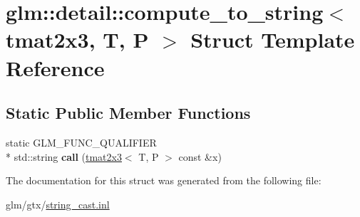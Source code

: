 \hypertarget{structglm_1_1detail_1_1compute__to__string_3_01tmat2x3_00_01T_00_01P_01_4}{\section{glm\-:\-:detail\-:\-:compute\-\_\-to\-\_\-string$<$ tmat2x3, T, P $>$ Struct Template Reference}
\label{structglm_1_1detail_1_1compute__to__string_3_01tmat2x3_00_01T_00_01P_01_4}
}
\subsection*{Static Public Member Functions}
\begin{DoxyCompactItemize}
\item 
\hypertarget{structglm_1_1detail_1_1compute__to__string_3_01tmat2x3_00_01T_00_01P_01_4_a69b0cc0650365f45aaf4c5aba6819abc}{static G\-L\-M\-\_\-\-F\-U\-N\-C\-\_\-\-Q\-U\-A\-L\-I\-F\-I\-E\-R \\*
std\-::string {\bfseries call} (\hyperlink{structglm_1_1tmat2x3}{tmat2x3}$<$ T, P $>$ const \&x)}\label{structglm_1_1detail_1_1compute__to__string_3_01tmat2x3_00_01T_00_01P_01_4_a69b0cc0650365f45aaf4c5aba6819abc}

\end{DoxyCompactItemize}


The documentation for this struct was generated from the following file\-:\begin{DoxyCompactItemize}
\item 
glm/gtx/\hyperlink{string__cast_8inl}{string\-\_\-cast.\-inl}\end{DoxyCompactItemize}
